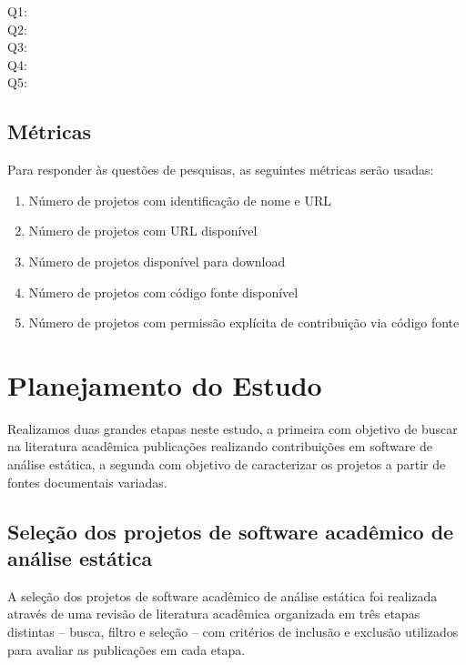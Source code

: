 \begin{description}
  \item [Q1:] \EstudoUmQuestaoUm
  \item [Q2:] \EstudoUmQuestaoDois
  \item [Q3:] \EstudoUmQuestaoTres
  \item [Q4:] \EstudoUmQuestaoQuatro
  \item [Q5:] \EstudoUmQuestaoCinco
\end{description}

\subsection{Métricas}

Para responder às questões de pesquisas, as seguintes métricas serão usadas:

\begin{enumerate}
  \item Número de projetos com identificação de nome e URL
  \item Número de projetos com URL disponível
  \item Número de projetos disponível para download
  \item Número de projetos com código fonte disponível
  \item Número de projetos com permissão explícita de contribuição via código fonte
\end{enumerate}




\section{Planejamento do Estudo} \label{estudo1:planejamento}

Realizamos duas grandes etapas neste estudo, a primeira com objetivo de buscar
na literatura acadêmica publicações realizando contribuições em software de
análise estática, a segunda com objetivo de caracterizar os projetos a partir
de fontes documentais variadas.

\subsection{Seleção dos projetos de software acadêmico de análise estática} %

A seleção dos projetos de software acadêmico de análise estática foi realizada
através de uma revisão de literatura acadêmica organizada em três etapas
distintas -- busca, filtro e seleção -- com critérios de inclusão e exclusão
utilizados para avaliar as publicações em cada etapa.

